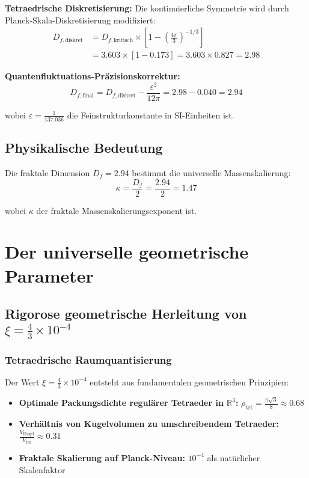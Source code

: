 \documentclass[12pt,a4paper]{article}
\numberwithin{equation}{section}
\newcommand{\xipar}{\xi}
\newcommand{\epsilonT}{\varepsilon}
\newcommand{\kappaT}{\kappa}
\newcommand{\Df}{D_f}
\newcommand{\Dfcritical}{D_{f,\text{kritisch}}}
\newcommand{\Dfdiscrete}{D_{f,\text{diskret}}}
\newcommand{\Dffinal}{D_{f,\text{final}}}
\begin{document}
	\textbf{Tetraedrische Diskretisierung:}
	Die kontinuierliche Symmetrie wird durch Planck-Skala-Diskretisierung modifiziert:
	\begin{align}
		\Dfdiscrete &= \Dfcritical \times \left[1 - \left(\frac{4\pi}{3}\right)^{-1/3}\right]\\
		&= 3.603 \times [1 - 0.173] = 3.603 \times 0.827 = 2.98
		\label{eq:df_discrete}
	\end{align}
	
	\textbf{Quantenfluktuations-Präzisionskorrektur:}
	\begin{equation}
		\Dffinal = \Dfdiscrete - \frac{ \epsilonT^2}{12\pi} = 2.98 - 0.040 = 2.94
		\label{eq:df_final}
	\end{equation}
	
	wobei $ \epsilonT = \frac{1}{137.036}$ die Feinstrukturkonstante in SI-Einheiten ist.
	
	\subsection{Physikalische Bedeutung}
	
	Die fraktale Dimension $\Df = 2.94$ bestimmt die universelle Massenskalierung:
	\begin{equation}
		\kappaT = \frac{\Df}{2} = \frac{2.94}{2} = 1.47
		\label{eq:kappa}
	\end{equation}
	
	wobei $\kappaT$ der fraktale Massenskalierungsexponent ist.
	
	\section{Der universelle geometrische Parameter}
	
	\subsection{Rigorose geometrische Herleitung von $\xipar = \frac{4}{3} \times 10^{-4}$}
	
	\subsubsection{Tetraedrische Raumquantisierung}
	
	Der Wert $\xipar = \frac{4}{3} \times 10^{-4}$ entsteht aus fundamentalen geometrischen Prinzipien:
	
	\begin{itemize}
		\item \textbf{Optimale Packungsdichte regulärer Tetraeder in $\mathbb{R}^3$:} $\rho_{\text{tet}} = \frac{\pi\sqrt{3}}{8} \approx 0.68$
		\item \textbf{Verhältnis von Kugelvolumen zu umschreibendem Tetraeder:} $\frac{V_{\text{Kugel}}}{V_{\text{tet}}} \approx 0.31$
		\item \textbf{Fraktale Skalierung auf Planck-Niveau:} $10^{-4}$ als natürlicher Skalenfaktor
	\end{itemize}
	
\end{document}
